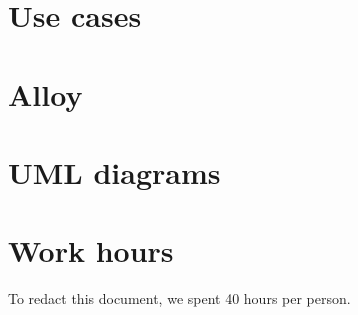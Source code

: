 \begin{appendices}
\chapter{Use cases}


\chapter{Alloy}


\chapter{UML diagrams}


\chapter{Work hours}
To redact this document, we spent 40 hours per person.

%    
%
%

\end{appendices}

